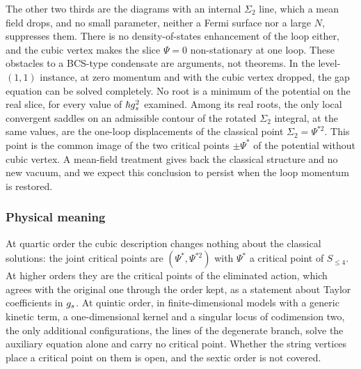 The other two thirds are the diagrams with an internal $\Sigma_2$ line, which a mean field drops, and no small parameter, neither a Fermi surface nor a large $N$, suppresses them.
There is no density-of-states enhancement of the loop either, and the cubic vertex makes the slice $\Psi = 0$ non-stationary at one loop.
These obstacles to a BCS-type condensate are arguments, not theorems.
In the level-$(1, 1)$ instance, at zero momentum and with the cubic vertex dropped, the gap equation can be solved completely.
No root is a minimum of the potential on the real slice, for every value of $\hbar g_s^2$ examined.
Among its real roots, the only local convergent saddles on an admissible contour of the rotated $\Sigma_2$ integral, at the same values, are the one-loop displacements of the classical point $\Sigma_2 = \Psi^{* 2}$.
This point is the common image of the two critical points $\pm \Psi^*$ of the potential without cubic vertex.
A mean-field treatment gives back the classical structure and no new vacuum, and we expect this conclusion to persist when the loop momentum is restored.

\subsubsection{Physical meaning}
\label{p:sec:sol:meaning}

At quartic order the cubic description changes nothing about the classical solutions: the joint critical points are $(\Psi^*, \Psi^{* 2})$ with $\Psi^*$ a critical point of $S_{\le 4}$.
At higher orders they are the critical points of the eliminated action, which agrees with the original one through the order kept, as a statement about Taylor coefficients in $g_s$.
At quintic order, in finite-dimensional models with a generic kinetic term, a one-dimensional kernel and a singular locus of codimension two, the only additional configurations, the lines of the degenerate branch, solve the auxiliary equation alone and carry no critical point.
Whether the string vertices place a critical point on them is open, and the sextic order is not covered.

